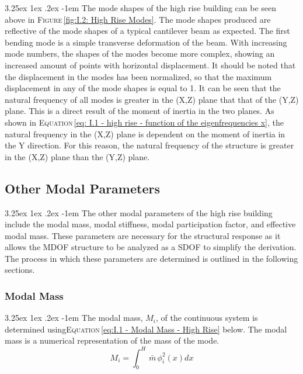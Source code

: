 \documentclass[11pt,a4paper,titlepage]{report}
\makeatletter
\renewcommand\paragraph{\@startsection{paragraph}{5}{\z@}%
  {3.25ex \@plus1ex \@minus.2ex}%
  {-1em}%
  {\normalfont\normalsize\bfseries}}
\makeatother
\begin{document}
\paragraph{}The mode shapes of the high rise building can be seen above in \textsc{Figure}\,\ref{fig:I.2: High Rise Modes}. The mode shapes produced are reflective of the mode shapes of a typical cantilever beam as expected. The first bending mode is a simple transverse deformation of the beam. With increasing mode numbers, the shapes of the modes become more complex, showing an increased amount of points with horizontal displacement. It should be noted that the displacement in the modes has been normalized, so that the maximum displacement in any of the mode shapes is equal to 1. It can be seen that the natural frequency of all modes is greater in the (X,Z) plane that that of the (Y,Z) plane. This is a direct result of the moment of inertia in the two planes. As shown in \textsc{Equation}\,\ref{eq: I.1 - high rise - function of the eigenfrequencies x}, the natural frequency in the (X,Z) plane is dependent on the moment of inertia in the Y direction. For this reason, the natural frequency of the structure is greater in the (X,Z) plane than the (Y,Z) plane.

\subsection{Other Modal Parameters}
\paragraph{}The other modal parameters of the high rise building include the modal mass, modal stiffness, modal participation factor, and effective modal mass. These parameters are necessary for the structural response as it allows the MDOF structure to be analyzed as a SDOF to simplify the derivation. The process in which these parameters are determined is outlined in the following sections.
\subsubsection{Modal Mass}
\paragraph{}The modal mass, $M_i$, of the continuous system is determined using\textsc{Equation}\,\eqref{eq:I.1 - Modal Mass - High Rise} below. The modal mass is a numerical representation of the mass of the mode.
\begin{equation}
    M_i = \int_{0}^{H}\,\bar{m}\,\phi_i^2(x)dx
    \label{eq:I.1 - Modal Mass - High Rise}
\end{equation}
\end{document}
